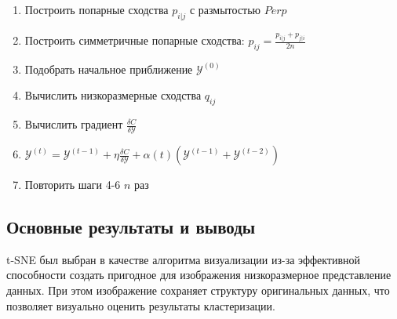 \begin{enumerate}
	\item Построить попарные сходства $p_{i|j}$ с размытостью $Perp$
	\item Построить симметричные попарные сходства: $p_{ij} = \frac{p_{i|j} + p_{j|i}}{2n}$
	\item Подобрать начальное приближение $\mathcal{Y}^{(0)}$
	\item Вычислить низкоразмерные сходства $q_{ij}$
	\item Вычислить градиент $\frac{\delta C}{\delta \mathcal{Y}}$
	\item $\mathcal{Y}^{(t)} = \mathcal{Y}^{(t - 1)} + \eta \frac{\delta C}{\delta \mathcal{Y}} + \alpha(t) (\mathcal{Y}^{(t -1)} + \mathcal{Y}^{(t-2)})$
	\item Повторить шаги 4-6 $n$ раз
\end{enumerate}
\subsection{Основные результаты и выводы}
t-SNE был выбран в качестве алгоритма визуализации из-за эффективной способности создать пригодное для изображения низкоразмерное представление данных. При этом изображение сохраняет структуру оригинальных данных, что позволяет визуально оценить результаты кластеризации.